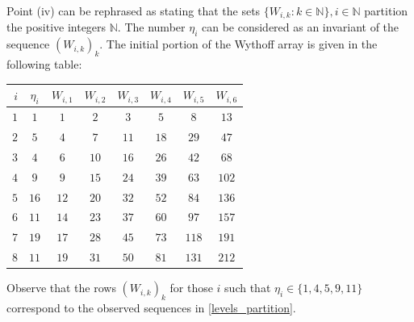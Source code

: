 \documentclass[]{interact}
\newcommand{\bbN}{\mathbb{N}}
\theoremstyle{definition}
\numberwithin{table}{section} %
\numberwithin{figure}{section}
\begin{document}
Point (iv) can be rephrased as stating that the sets $\{W_{i, k}: k \in \bbN\}, i \in \bbN$ partition the positive integers $\bbN$. The number $\eta_i$ can be considered as an invariant of the sequence $(W_{i, k})_k$. The initial portion of the Wythoff array is given in the following table:
\begin{center}
	\begin{tabular}{r||c||c|c|c|c|c|c}
		$i$ & $\eta_i$ & $W_{i, 1}$ & $W_{i, 2}$ & $W_{i, 3}$ & $W_{i, 4}$ & $W_{i, 5}$ & $W_{i, 6}$ \\
		\hline
		$1$ & $1$ & $1$ & $2$ & $3$ & $5$ & $8$ & $13$ \\
		\hline
		$2$ & $5$ & $4$ & $7$ & $11$ & $18$ & $29$ & $47$ \\
		\hline
		$3$ & $4$ & $6$ & $10$ & $16$ & $26$ & $42$ & $68$ \\
		\hline
		$4$ & $9$ & $9$ & $15$ & $24$ & $39$ & $63$ & $102$ \\
		\hline
		$5$ & $16$ & $12$ & $20$ & $32$ & $52$ & $84$ & $136$ \\
		\hline
		$6$ & $11$ & $14$ & $23$ & $37$ & $60$ & $97$ & $157$ \\
		\hline
		$7$ & $19$ & $17$ & $28$ & $45$ & $73$ & $118$ & $191$ \\
		\hline
		$8$ & $11$ & $19$ & $31$ & $50$ & $81$ & $131$ & $212$
	\end{tabular}
\end{center}
Observe that the rows $(W_{i, k})_k$ for those $i$ such that $\eta_i \in \{1, 4, 5, 9, 11\}$ correspond to the observed sequences in \eqref{levels_partition}.
\end{document}
